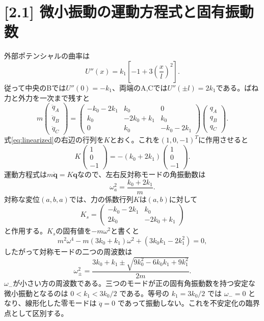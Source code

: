 \documentclass[11pt,a4paper]{article}
\begin{document}
\section*{[2.1] 微小振動の運動方程式と固有振動数}
外部ポテンシャルの曲率は
\begin{equation}
  U''(x)=k_1\left[-1+3\left(\frac{x}{l}\right)^2\right].
\end{equation}
従って中央のBでは$U''(0)=-k_1$、両端のA,Cでは$U''(\pm l)=2k_1$である。ばね力と外力を一次まで残すと
\begin{equation}
  m\begin{pmatrix}\ddot q_A\\\ddot q_B\\\ddot q_C\end{pmatrix}
  =\begin{pmatrix}
    -k_0-2k_1&k_0&0\\
    k_0&-2k_0+k_1&k_0\\
    0&k_0&-k_0-2k_1
  \end{pmatrix}
  \begin{pmatrix}q_A\\q_B\\q_C\end{pmatrix}.
  \label{eq:linearized}
\end{equation}
式\eqref{eq:linearized}の右辺の行列を$K$とおく。これを$(1,0,-1)^T$に作用させると
\begin{equation}
  K\begin{pmatrix}1\\0\\-1\end{pmatrix}
  =-(k_0+2k_1)\begin{pmatrix}1\\0\\-1\end{pmatrix}.
\end{equation}
運動方程式は$m\ddot{\boldsymbol q}=K\boldsymbol q$なので、左右反対称モードの角振動数は
\begin{equation}
  \boxed{\omega_a^2=\frac{k_0+2k_1}{m}}.
\end{equation}
対称な変位$(a,b,a)$では、力の係数行列$K$は$(a,b)$に対して
\begin{equation}
  K_s=\begin{pmatrix}-k_0-2k_1&k_0\\2k_0&-2k_0+k_1\end{pmatrix}
\end{equation}
と作用する。$K_s$の固有値を$-m\omega^2$と書くと
\begin{equation}
  m^2\omega^4-m(3k_0+k_1)\omega^2+(3k_0k_1-2k_1^2)=0,
\end{equation}
したがって対称モードの二つの周波数は
\begin{equation}
  \boxed{\omega_{\pm}^2=
  \frac{3k_0+k_1\pm\sqrt{9k_0^2-6k_0k_1+9k_1^2}}{2m}}.
\end{equation}
$\omega_-$が小さい方の周波数である。三つのモードが正の固有角振動数を持つ安定な微小振動となるのは $0<k_1<3k_0/2$ である。等号の $k_1=3k_0/2$ では $\omega_-=0$ となり、線形化した零モードは $\ddot q=0$ であって振動しない。これを不安定化の臨界点として区別する。
\end{document}
